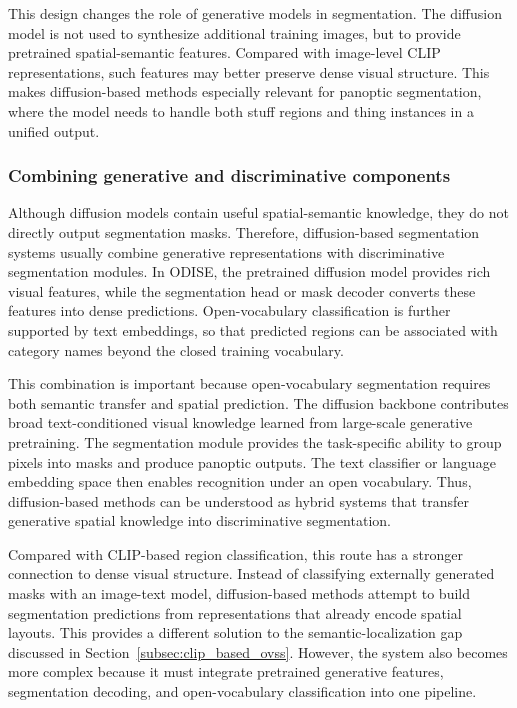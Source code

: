 This design changes the role of generative models in segmentation. 
The diffusion model is not used to synthesize additional training images, but to provide pretrained spatial-semantic features. 
Compared with image-level CLIP representations, such features may better preserve dense visual structure. 
This makes diffusion-based methods especially relevant for panoptic segmentation, where the model needs to handle both stuff regions and thing instances in a unified output.

\subsubsection{Combining generative and discriminative components}

Although diffusion models contain useful spatial-semantic knowledge, they do not directly output segmentation masks. 
Therefore, diffusion-based segmentation systems usually combine generative representations with discriminative segmentation modules. 
In ODISE, the pretrained diffusion model provides rich visual features, while the segmentation head or mask decoder converts these features into dense predictions. 
Open-vocabulary classification is further supported by text embeddings, so that predicted regions can be associated with category names beyond the closed training vocabulary.

This combination is important because open-vocabulary segmentation requires both semantic transfer and spatial prediction. 
The diffusion backbone contributes broad text-conditioned visual knowledge learned from large-scale generative pretraining. 
The segmentation module provides the task-specific ability to group pixels into masks and produce panoptic outputs. 
The text classifier or language embedding space then enables recognition under an open vocabulary. 
Thus, diffusion-based methods can be understood as hybrid systems that transfer generative spatial knowledge into discriminative segmentation.

Compared with CLIP-based region classification, this route has a stronger connection to dense visual structure. 
Instead of classifying externally generated masks with an image-text model, diffusion-based methods attempt to build segmentation predictions from representations that already encode spatial layouts. 
This provides a different solution to the semantic-localization gap discussed in Section~\ref{subsec:clip_based_ovss}. 
However, the system also becomes more complex because it must integrate pretrained generative features, segmentation decoding, and open-vocabulary classification into one pipeline.

